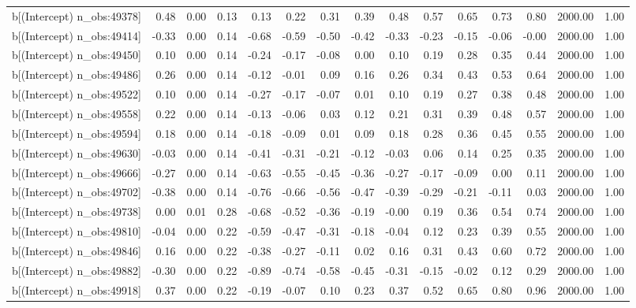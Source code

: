 \begin{table}[ht]
\begin{tabular}{rrrrrrrrrrrrrrr}
  b[(Intercept) n\_obs:49378] & 0.48 & 0.00 & 0.13 & 0.13 & 0.22 & 0.31 & 0.39 & 0.48 & 0.57 & 0.65 & 0.73 & 0.80 & 2000.00 & 1.00 \\ 
  b[(Intercept) n\_obs:49414] & -0.33 & 0.00 & 0.14 & -0.68 & -0.59 & -0.50 & -0.42 & -0.33 & -0.23 & -0.15 & -0.06 & -0.00 & 2000.00 & 1.00 \\ 
  b[(Intercept) n\_obs:49450] & 0.10 & 0.00 & 0.14 & -0.24 & -0.17 & -0.08 & 0.00 & 0.10 & 0.19 & 0.28 & 0.35 & 0.44 & 2000.00 & 1.00 \\ 
  b[(Intercept) n\_obs:49486] & 0.26 & 0.00 & 0.14 & -0.12 & -0.01 & 0.09 & 0.16 & 0.26 & 0.34 & 0.43 & 0.53 & 0.64 & 2000.00 & 1.00 \\ 
  b[(Intercept) n\_obs:49522] & 0.10 & 0.00 & 0.14 & -0.27 & -0.17 & -0.07 & 0.01 & 0.10 & 0.19 & 0.27 & 0.38 & 0.48 & 2000.00 & 1.00 \\ 
  b[(Intercept) n\_obs:49558] & 0.22 & 0.00 & 0.14 & -0.13 & -0.06 & 0.03 & 0.12 & 0.21 & 0.31 & 0.39 & 0.48 & 0.57 & 2000.00 & 1.00 \\ 
  b[(Intercept) n\_obs:49594] & 0.18 & 0.00 & 0.14 & -0.18 & -0.09 & 0.01 & 0.09 & 0.18 & 0.28 & 0.36 & 0.45 & 0.55 & 2000.00 & 1.00 \\ 
  b[(Intercept) n\_obs:49630] & -0.03 & 0.00 & 0.14 & -0.41 & -0.31 & -0.21 & -0.12 & -0.03 & 0.06 & 0.14 & 0.25 & 0.35 & 2000.00 & 1.00 \\ 
  b[(Intercept) n\_obs:49666] & -0.27 & 0.00 & 0.14 & -0.63 & -0.55 & -0.45 & -0.36 & -0.27 & -0.17 & -0.09 & 0.00 & 0.11 & 2000.00 & 1.00 \\ 
  b[(Intercept) n\_obs:49702] & -0.38 & 0.00 & 0.14 & -0.76 & -0.66 & -0.56 & -0.47 & -0.39 & -0.29 & -0.21 & -0.11 & 0.03 & 2000.00 & 1.00 \\ 
  b[(Intercept) n\_obs:49738] & 0.00 & 0.01 & 0.28 & -0.68 & -0.52 & -0.36 & -0.19 & -0.00 & 0.19 & 0.36 & 0.54 & 0.74 & 2000.00 & 1.00 \\ 
  b[(Intercept) n\_obs:49810] & -0.04 & 0.00 & 0.22 & -0.59 & -0.47 & -0.31 & -0.18 & -0.04 & 0.12 & 0.23 & 0.39 & 0.55 & 2000.00 & 1.00 \\ 
  b[(Intercept) n\_obs:49846] & 0.16 & 0.00 & 0.22 & -0.38 & -0.27 & -0.11 & 0.02 & 0.16 & 0.31 & 0.43 & 0.60 & 0.72 & 2000.00 & 1.00 \\ 
  b[(Intercept) n\_obs:49882] & -0.30 & 0.00 & 0.22 & -0.89 & -0.74 & -0.58 & -0.45 & -0.31 & -0.15 & -0.02 & 0.12 & 0.29 & 2000.00 & 1.00 \\ 
  b[(Intercept) n\_obs:49918] & 0.37 & 0.00 & 0.22 & -0.19 & -0.07 & 0.10 & 0.23 & 0.37 & 0.52 & 0.65 & 0.80 & 0.96 & 2000.00 & 1.00 \\ 

\end{tabular}
\end{table}

